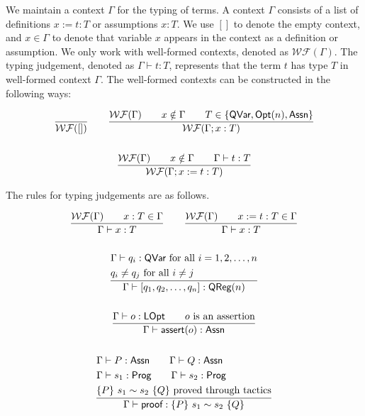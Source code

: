 \newcommand{\WF}[1]{\ensuremath{\mathcal{WF}(#1)}}

We maintain a context $\Gamma$ for the typing of terms. A context $\Gamma$ consists of a list of definitions $x := t : T$ or assumptions $x : T$. 
We use $[]$ to denote the empty context, and $x \in \Gamma$ to denote that variable $x$ appears in the context as a definition or assumption.
We only work with well-formed contexts, denoted as \WF{\Gamma}. The typing judgement, denoted as $\Gamma \vdash t : T$, represents that the term $t$ has type $T$ in well-formed context $\Gamma$. The well-formed contexts can be constructed in the following ways:

\begin{gather*}
    \frac{}{\WF{[]}} 
    \qquad 
    \frac{\WF{\Gamma} \qquad x \notin \Gamma \qquad T \in \{\qvar, \opt{n}, \assn \}}{\WF{\Gamma;x:T}} \\
    \\
    \frac{\WF{\Gamma} \qquad x \notin \Gamma \qquad \Gamma \vdash t : T}{\WF{\Gamma;x := t : T}} 
\end{gather*}

The rules for typing judgements are as follows.

\begin{gather*}
    \frac{\WF{\Gamma} \qquad x : T \in \Gamma}{\Gamma \vdash x : T}
    \qquad
    \frac{\WF{\Gamma} \qquad x := t : T \in \Gamma}{\Gamma \vdash x : T} \\
    \\
    \frac{
        \begin{aligned}
            & \Gamma \vdash q_i : \qvar \text{ for all } i = 1, 2, \dots, n\\
            & q_i \neq q_j \text{ for all } i \neq j
        \end{aligned}}{\Gamma \vdash [q_1, q_2, \dots, q_n] : \qreg{n}} \\
    \\
    \frac{\Gamma \vdash o : \lopt \qquad \text{$o$ is an assertion}}{\Gamma \vdash \assert{o} : \assn} \\
    \\
    \frac{
        \begin{aligned}
            & \Gamma \vdash P : \assn \qquad \Gamma \vdash Q : \assn  \\
            & \Gamma \vdash s_1 : \prog \qquad \Gamma \vdash s_2 : \prog \\
            & \judge{P}{s_1}{s_2}{Q} \text{ proved through tactics}
        \end{aligned}}
        {
            \Gamma \vdash \pf : \judge{P}{s_1}{s_2}{Q}
        }
\end{gather*}

